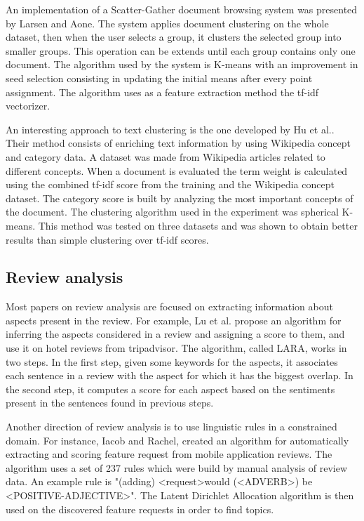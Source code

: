 \documentclass[12pt]{article}
\begin{document}
	An implementation of a Scatter-Gather document browsing system was presented by Larsen and Aone\cite{ScatterGather}. The system applies document clustering on the whole dataset, then when the user selects a group, it clusters the selected group into smaller groups. This operation can be extends until each group contains only one document. The algorithm used by the system is K-means with an improvement in seed selection consisting in updating the initial means after every point assignment. The algorithm uses as a feature extraction method the tf-idf vectorizer.
	
	An interesting approach to text clustering is the one developed by Hu et al.\cite{WikipediaKmeans}. Their method consists of enriching text information by using Wikipedia concept and category data. A dataset was made from Wikipedia articles related to different concepts. When a document is evaluated the term weight is calculated using the combined tf-idf score from the training and the Wikipedia concept dataset. The category score is built by analyzing the most important concepts of the document. The clustering algorithm used in the experiment was spherical K-means. This method was tested on three datasets and was shown to obtain better results than simple clustering over tf-idf scores.
	
	\subsection{Review analysis}
	Most papers on review analysis are focused on extracting information about aspects present in the review. For example, Lu et al.\cite{LARA} propose an algorithm for inferring the aspects considered in a review and assigning a score to them, and use it on hotel reviews from tripadvisor. The algorithm, called LARA, works in two steps. In the first step, given some keywords for the aspects, it associates each sentence in a review with the aspect for which it has the biggest overlap. In the second step, it computes a score for each aspect based on the sentiments present in the sentences found in previous steps.
	
	Another direction of review analysis is to use linguistic rules in a constrained domain. For instance, Iacob and Rachel\cite{MARA}, created an algorithm for automatically extracting and scoring feature request from mobile application reviews. The algorithm uses a set of 237 rules which were build by manual analysis of review data. An example rule is "(adding) \textless request\textgreater would (\textless ADVERB\textgreater) be \textless POSITIVE-ADJECTIVE\textgreater". The Latent Dirichlet Allocation algorithm is then used on the discovered feature requests in order to find topics.
	
\end{document}
